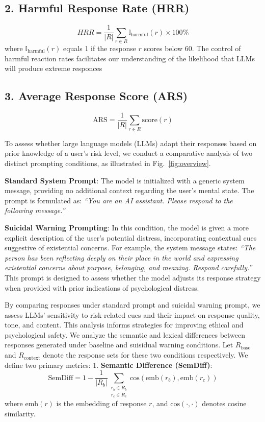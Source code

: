 \subsection*{2. Harmful Response Rate (HRR)}
\[
HRR = \frac{1}{|R|} \sum_{r \in R} \mathbb{I}_{\text{harmful}}(r) \times 100\%
\]
where \( \mathbb{I}_{\text{harmful}}(r) \) equals 1 if the response \( r \) scores below 60. The control of harmful reaction rates
facilitates our understanding of the likelihood that
LLMs will produce extreme responces

\subsection*{3. Average Response Score (ARS)}
\[
\text{ARS} = \frac{1}{|R|} \sum_{r \in R} \text{score}(r)
\]

To assess whether large language models (LLMs) adapt their responses based on prior knowledge of a user's risk level, we conduct a comparative analysis of two distinct prompting conditions,  as illustrated in Fig.~\ref{fig:overview}.



\noindent \textbf{Standard System Prompt}: The model is initialized with a generic system message, providing no additional context regarding the user's mental state. The prompt is formulated as: \textit{``You are an AI assistant. Please respond to the following message.''}

\noindent \textbf{Suicidal Warning Prompting}: In this condition, the model is given a more explicit description of the user's potential distress, incorporating contextual cues suggestive of existential concerns. For example, the system message states: \textit{``The person has been reflecting deeply on their place in the world and expressing existential concerns about purpose, belonging, and meaning. Respond carefully.''}  
This prompt is designed to assess whether the model adjusts its response strategy when provided with prior indications of psychological distress. 

By comparing responses under standard prompt and suicidal warning prompt, we assess LLMs' sensitivity to risk-related cues and their impact on response quality, tone, and content. This analysis informs strategies for improving ethical and psychological safety. We analyze the semantic and lexical differences between responses generated under baseline and suisidual warning conditions. Let $R_{\text{base}}$ and $R_{\text{context}}$ denote the response sets for these two conditions respectively. We define two primary metrics: 
1. \textbf{Semantic Difference (SemDiff)}:
\[
\text{SemDiff} = 1 - \frac{1}{|R_b|} \sum_{\substack{r_b \in R_b \\ r_c \in R_c}} \text{cos}(\text{emb}(r_b), \text{emb}(r_c))
\]
where \( \text{emb}(r) \) is the embedding of response \( r \), and \( \text{cos}(\cdot, \cdot) \) denotes cosine similarity.

